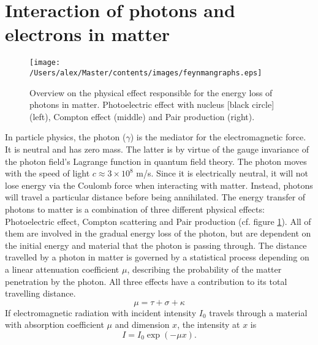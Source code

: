 
\section{Interaction of photons and electrons in matter}
\begin{figure}[hbt]
\centering
\texttt{[image: /Users/alex/Master/contents/images/feynmangraphs.eps]}
\caption{Overview on the physical effect responsible for the energy loss of photons in matter. Photoelectric effect with nucleus [black circle] (left), Compton effect (middle) and Pair production (right).}
\label{fig:feynmangraphs}
\end{figure}
In particle physics, the photon ($\gamma$) is the mediator for the electromagnetic force. It is neutral and has zero mass. The latter is by virtue of the gauge invariance of the photon field's Lagrange function in quantum field theory. The photon moves with the speed of light $c \approx 3\times10^8$ m/s. Since it is electrically neutral, it will not lose energy via the Coulomb force when interacting with matter. Instead, photons will travel a particular distance before being annihilated. The energy transfer of photons to matter is a combination of three different physical effects: Photoelectric effect, Compton scattering and Pair production (cf. figure \ref{fig:feynmangraphs}). All of them are involved in the gradual energy loss of the photon, but are dependent on the initial energy and material that the photon is passing through. The distance travelled by a photon in matter is governed by a statistical process depending on a linear attenuation coefficient $\mu$, describing the probability of the matter penetration by the photon. All three effects have a contribution to its total travelling distance.
\begin{equation}
\mu = \tau + \sigma + \kappa
\end{equation}
If electromagnetic radiation with incident intensity $I_0$ travels through a material with absorption coefficient $\mu$ and dimension $x$, the intensity at $x$ is
\begin{equation}
I = I_0 \exp(-\mu x).
\end{equation}


